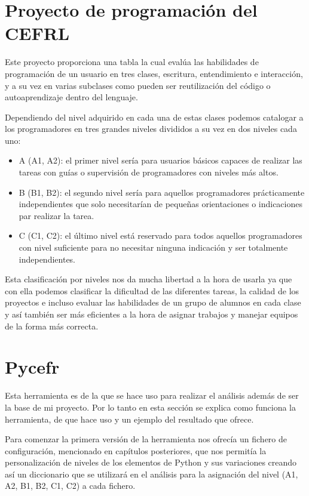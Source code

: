 \documentclass[a4paper, 12pt]{book}
\begin{document}
\section{Proyecto de programación del CEFRL}
\label{Proyecto de programación del CEFRL}

Este proyecto proporciona una tabla la cual evalúa las habilidades de programación de un usuario en tres clases, escritura, entendimiento e interacción, y a su vez en varias subclases como pueden ser reutilización del código o autoaprendizaje dentro del lenguaje.

Dependiendo del nivel adquirido en cada una de estas clases podemos catalogar a los programadores en tres grandes niveles divididos a su vez en dos niveles cada uno: 

\begin{itemize}
	\item A (A1, A2): el primer nivel sería para usuarios básicos capaces de realizar las tareas con guías o supervisión de programadores con niveles más altos.
	\item B (B1, B2): el segundo nivel sería para aquellos programadores prácticamente independientes que solo necesitarían de pequeñas orientaciones o indicaciones par realizar la tarea.
	\item C (C1, C2): el último nivel está reservado para todos aquellos programadores con nivel suficiente para no necesitar ninguna indicación y ser totalmente independientes.
\end{itemize}

Esta clasificación por niveles nos da mucha libertad a la hora de usarla ya que con ella podemos clasificar la dificultad de las diferentes tareas, la calidad de los proyectos e incluso evaluar las habilidades de un grupo de alumnos en cada clase y así también ser más eficientes a la hora de asignar trabajos y manejar equipos de la forma más correcta.

\section{Pycefr}
\label{Pycefr}

Esta herramienta es de la que se hace uso para realizar el análisis además de ser la base de mi proyecto. Por lo tanto en esta sección se explica como funciona la herramienta, de que hace uso y un ejemplo del resultado que ofrece.

Para comenzar la primera versión de la herramienta nos ofrecía un fichero de configuración, mencionado en capítulos posteriores, que nos permitía la personalización de niveles de los elementos de Python y sus variaciones creando así un diccionario que se utilizará en el análisis para la asignación del nivel (A1, A2, B1, B2, C1, C2) a cada fichero.
\end{document}
